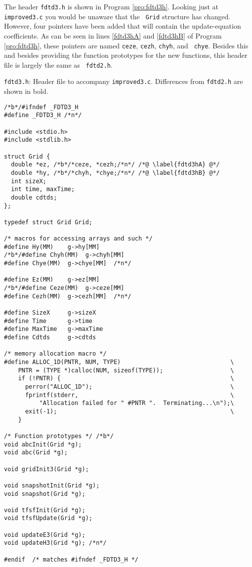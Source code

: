 The header {\tt fdtd3.h} is shown in Program \ref{pro:fdtd3h}.
Looking just at {\tt improved3.c} you would be unaware that the {\tt
  Grid} structure has changed.  However, four pointers have been added
that will contain the update-equation coefficients.  As can be seen in
lines \ref{fdtd3hA} and \ref{fdtd3hB} of Program \ref{pro:fdtd3h},
these pointers are named {\tt ceze}, {\tt cezh}, {\tt chyh}, and {\tt
  chye}.  Besides this and besides providing the function prototypes
for the new functions, this header file is largely the same as {\tt
  fdtd2.h}.
\begin{program}
{\tt fdtd3.h}: Header file to accompany {\tt improved3.c}.
Differences from {\tt fdtd2.h} are shown in bold.  \label{pro:fdtd3h}
\codemiddle
\begin{lstlisting}
/*b*/#ifndef _FDTD3_H
#define _FDTD3_H /*n*/

#include <stdio.h>
#include <stdlib.h>

struct Grid {
  double *ez, /*b*/*ceze, *cezh;/*n*/ /*@ \label{fdtd3hA} @*/
  double *hy, /*b*/*chyh, *chye;/*n*/ /*@ \label{fdtd3hB} @*/
  int sizeX;
  int time, maxTime;
  double cdtds;
};

typedef struct Grid Grid;

/* macros for accessing arrays and such */
#define Hy(MM)    g->hy[MM]
/*b*/#define Chyh(MM)  g->chyh[MM]
#define Chye(MM)  g->chye[MM]  /*n*/

#define Ez(MM)    g->ez[MM]
/*b*/#define Ceze(MM)  g->ceze[MM]
#define Cezh(MM)  g->cezh[MM]  /*n*/

#define SizeX     g->sizeX
#define Time      g->time
#define MaxTime   g->maxTime
#define Cdtds     g->cdtds

/* memory allocation macro */
#define ALLOC_1D(PNTR, NUM, TYPE)                               \
    PNTR = (TYPE *)calloc(NUM, sizeof(TYPE));                   \
    if (!PNTR) {                                                \
      perror("ALLOC_1D");                                       \
      fprintf(stderr,                                           \
          "Allocation failed for " #PNTR ".  Terminating...\n");\
      exit(-1);                                                 \
    }

/* Function prototypes */ /*b*/
void abcInit(Grid *g);
void abc(Grid *g);

void gridInit3(Grid *g);

void snapshotInit(Grid *g);
void snapshot(Grid *g);

void tfsfInit(Grid *g);
void tfsfUpdate(Grid *g);

void updateE3(Grid *g);
void updateH3(Grid *g); /*n*/

#endif  /* matches #ifndef _FDTD3_H */
\end{lstlisting}
\end{program}

